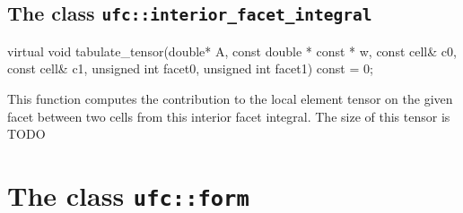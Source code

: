 






\subsection{The class \texttt{ufc::interior\_facet\_integral}}
\begin{code}
virtual void tabulate_tensor(double* A,
                             const double * const * w,
                             const cell& c0,
                             const cell& c1,
                             unsigned int facet0,
                             unsigned int facet1) const = 0;
\end{code}
This function computes the contribution to the local element tensor
on the given facet between two cells from this interior facet integral.
The size of this tensor is TODO


\section{The class \texttt{ufc::form}}

